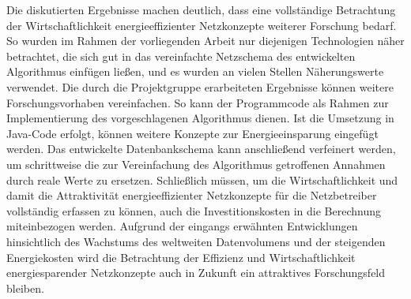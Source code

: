 \documentclass[12pt,titlepage]{article}
\begin{document}
Die diskutierten Ergebnisse machen deutlich, dass eine vollständige Betrachtung der Wirtschaftlichkeit energieeffizienter Netzkonzepte weiterer Forschung bedarf. So wurden im Rahmen der vorliegenden Arbeit nur diejenigen Technologien näher betrachtet, die sich gut in das vereinfachte Netzschema des entwickelten Algorithmus einfügen ließen, und es wurden an vielen Stellen Näherungswerte verwendet.
Die durch die Projektgruppe erarbeiteten Ergebnisse können weitere Forschungsvorhaben vereinfachen. So kann der Programmcode	 als Rahmen zur Implementierung des vorgeschlagenen Algorithmus dienen. Ist die Umsetzung in Java-Code erfolgt, können weitere Konzepte zur Energieeinsparung eingefügt werden. Das entwickelte Datenbankschema kann anschließend verfeinert werden, um schrittweise die zur Vereinfachung des Algorithmus getroffenen Annahmen durch reale Werte zu ersetzen. Schließlich müssen, um die Wirtschaftlichkeit und damit die Attraktivität energieeffizienter Netzkonzepte für die Netzbetreiber vollständig erfassen zu können, auch die Investitionskosten in die Berechnung miteinbezogen werden.
Aufgrund der eingangs erwähnten Entwicklungen hinsichtlich des Wachstums des weltweiten Datenvolumens und der steigenden Energiekosten wird die Betrachtung der Effizienz und Wirtschaftlichkeit energiesparender Netzkonzepte auch in Zukunft ein attraktives Forschungsfeld bleiben.

\newpage
\printbibliography
\end{document}
